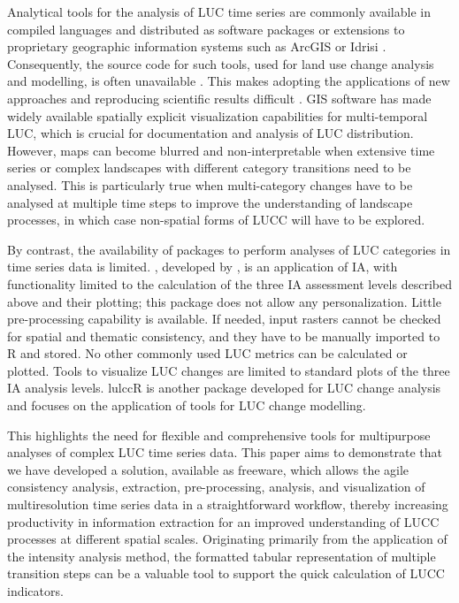 Analytical tools for the analysis of LUC time series are commonly
available in compiled languages and distributed as software packages or
extensions to proprietary geographic information systems such as ArcGIS
or Idrisi \citep{Moulds2015}. Consequently, the source code for such
tools, used for land use change analysis and modelling, is often
unavailable \citep{Rosa2014}. This makes adopting the applications of
new approaches and reproducing scientific results difficult
\citep{Morin2012, Peng2011}. GIS software has made widely available
spatially explicit visualization capabilities for multi-temporal LUC,
which is crucial for documentation and analysis of LUC distribution.
However, maps can become blurred and non-interpretable when extensive
time series or complex landscapes with different category transitions
need to be analysed. This is particularly true when multi-category
changes have to be analysed at multiple time steps to improve the
understanding of landscape processes, in which case non-spatial forms of
LUCC will have to be explored.

By contrast, the availability of packages to perform analyses of LUC
categories in time series data is limited. , developed
by \citet{PontiusJr.2019}, is an application of IA, with functionality
limited to the calculation of the three IA assessment levels described
above and their plotting; this package does not allow any
personalization. Little pre-processing capability is available. If
needed, input rasters cannot be checked for spatial and thematic
consistency, and they have to be manually imported to R and stored. No
other commonly used LUC metrics can be calculated or plotted. Tools to
visualize LUC changes are limited to standard plots of the three IA
analysis levels. lulccR \citep{Moulds2015} is another package developed
for LUC change analysis and focuses on the application of tools for LUC
change modelling.

This highlights the need for flexible and comprehensive tools for
multipurpose analyses of complex LUC time series data. This paper aims
to demonstrate that we have developed a solution, available as freeware,
which allows the agile consistency analysis, extraction, pre-processing,
analysis, and visualization of multiresolution time series data in a
straightforward workflow, thereby increasing productivity in information
extraction for an improved understanding of LUCC processes at different
spatial scales. Originating primarily from the application of the
intensity analysis method, the formatted tabular representation of
multiple transition steps can be a valuable tool to support the quick
calculation of LUCC indicators.

